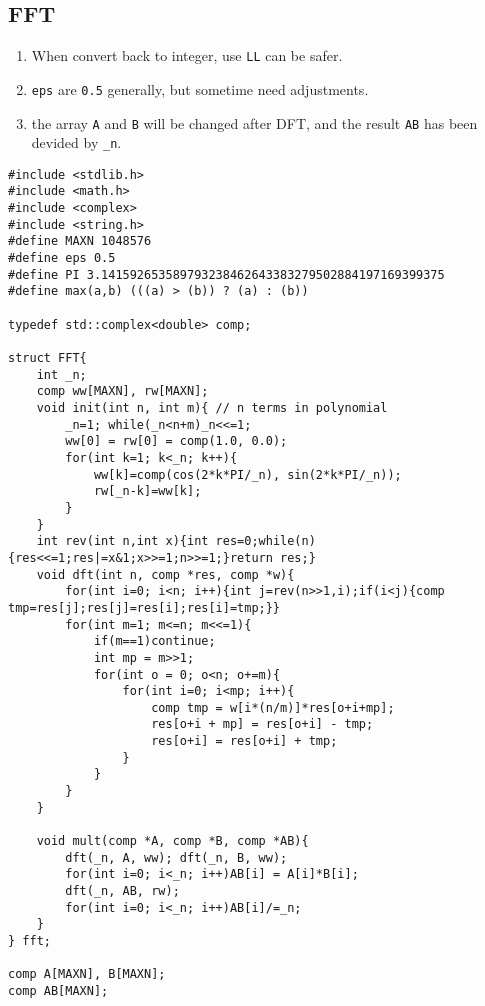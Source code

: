 \subsection{FFT}
\begin{enumerate}
\itemsep-0.5em
\item When convert back to integer, use \lstinline{LL} can be safer.
\item \lstinline{eps} are \lstinline{0.5} generally, but sometime need adjustments.
\item the array \lstinline{A} and \lstinline{B} will be changed after DFT, and the result \lstinline{AB} has been devided by \lstinline{_n}.
\end{enumerate}
\begin{lstlisting}
#include <stdlib.h>
#include <math.h>
#include <complex>
#include <string.h>
#define MAXN 1048576
#define eps 0.5
#define PI 3.141592653589793238462643383279502884197169399375
#define max(a,b) (((a) > (b)) ? (a) : (b))

typedef std::complex<double> comp;

struct FFT{
	int _n;
	comp ww[MAXN], rw[MAXN];
	void init(int n, int m){ // n terms in polynomial
		_n=1; while(_n<n+m)_n<<=1;
		ww[0] = rw[0] = comp(1.0, 0.0);
		for(int k=1; k<_n; k++){
			ww[k]=comp(cos(2*k*PI/_n), sin(2*k*PI/_n));
			rw[_n-k]=ww[k];
		}
	}
	int rev(int n,int x){int res=0;while(n){res<<=1;res|=x&1;x>>=1;n>>=1;}return res;}
	void dft(int n, comp *res, comp *w){
		for(int i=0; i<n; i++){int j=rev(n>>1,i);if(i<j){comp tmp=res[j];res[j]=res[i];res[i]=tmp;}}
		for(int m=1; m<=n; m<<=1){ 
			if(m==1)continue;
			int mp = m>>1;
			for(int o = 0; o<n; o+=m){
				for(int i=0; i<mp; i++){
					comp tmp = w[i*(n/m)]*res[o+i+mp];
					res[o+i + mp] = res[o+i] - tmp;
					res[o+i] = res[o+i] + tmp;
				}
			}
		}
	}

	void mult(comp *A, comp *B, comp *AB){
		dft(_n, A, ww); dft(_n, B, ww);
		for(int i=0; i<_n; i++)AB[i] = A[i]*B[i];
		dft(_n, AB, rw);
		for(int i=0; i<_n; i++)AB[i]/=_n;
	}
} fft;

comp A[MAXN], B[MAXN];
comp AB[MAXN];
\end{lstlisting}
